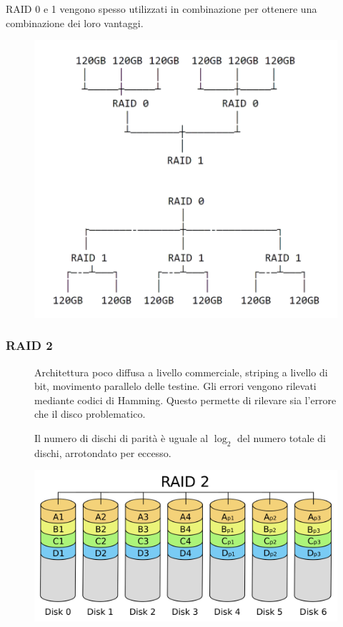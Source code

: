 \begin{note}
    RAID 0 e 1 vengono spesso utilizzati in combinazione per ottenere una combinazione dei loro vantaggi.

    \begin{figure}[H]
        \centering
        \includegraphics[width=0.4\linewidth]{assets/RAID01.png}
    \end{figure}
\end{note}

\subsubsection*{RAID 2}
\begin{figure}[H]
    \centering
    \begin{minipage}{0.65\textwidth}
        Architettura poco diffusa a livello commerciale, striping a livello di bit, movimento parallelo delle testine. Gli errori vengono rilevati mediante codici di Hamming. Questo permette di rilevare sia l'errore che il disco problematico.

        Il numero di dischi di parità è uguale al $\log_2$ del numero totale di dischi, arrotondato per eccesso.
    \end{minipage}
    \hfill
    \begin{minipage}{0.3\textwidth}
        \centering
        \includegraphics[width=1\linewidth]{assets/RAID_2.png}
    \end{minipage}
\end{figure}

